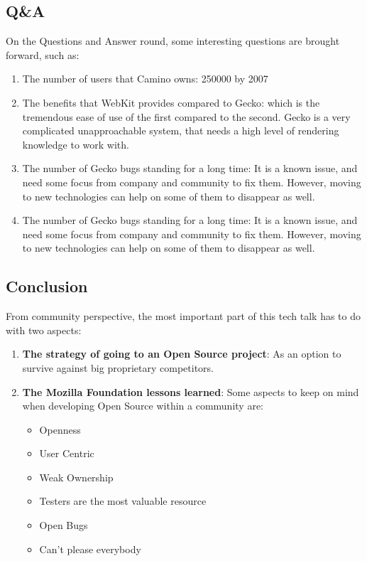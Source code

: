 \documentclass[11pt]{article}
\begin{document}
\subsection{Q\&A}
On the Questions and Answer round, some interesting questions are brought forward, such as:
\begin{enumerate}\itemsep0pt
\item{The number of users that Camino owns}: 250000 by 2007
\item{The benefits that WebKit provides compared to Gecko}: which is the tremendous ease of use of the first compared to the second. Gecko is a very complicated unapproachable system, that needs a high level of rendering knowledge to work with.
\item{The number of Gecko bugs standing for a long time}: It is a known issue, and need some focus from company and community to fix them. However, moving to new technologies can help on some of them to disappear as well.
\item{The number of Gecko bugs standing for a long time}: It is a known issue, and need some focus from company and community to fix them. However, moving to new technologies can help on some of them to disappear as well.
\end{enumerate}

\subsection{Conclusion}
From community perspective, the most important part of this tech talk has to do with two aspects:
\begin{enumerate}
\item{\textbf{The strategy of going to an Open Source project}}: As an option to survive against big proprietary competitors.
\item{\textbf{The Mozilla Foundation lessons learned}}: Some aspects to keep on mind when developing Open Source within a community are:
\begin{itemize}
\item{Openness}
\item{User Centric}
\item{Weak Ownership}
\item{Testers are the most valuable resource}
\item{Open Bugs}
\item{Can't please everybody}
\end{itemize}
\end{enumerate}
\end{document}

